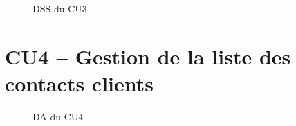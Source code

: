 \begin{figure}[H]
\noindent{}
\caption{DSS du CU3}
\end{figure}


\section{CU4 – Gestion de la liste des contacts clients}

\begin{figure}[H]
\noindent{}
\caption{DA du CU4}
\end{figure}

